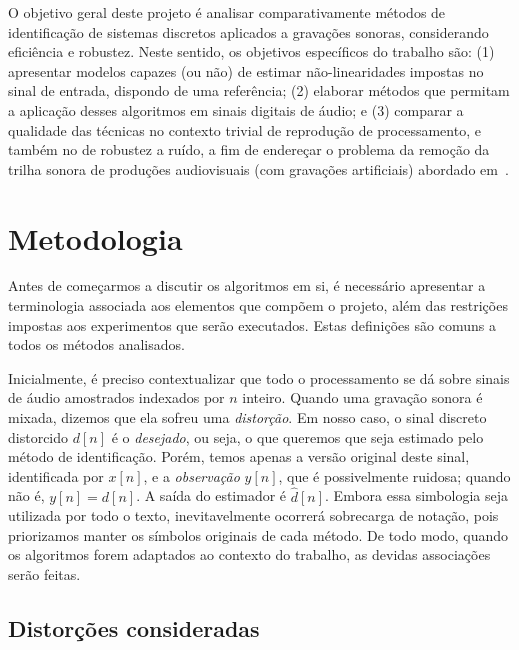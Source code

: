 O objetivo geral deste projeto é analisar comparativamente métodos de identificação de
sistemas discretos aplicados a gravações sonoras, considerando eficiência e robustez.
Neste sentido, os objetivos específicos do trabalho são: (1) apresentar modelos capazes
(ou não) de estimar não-linearidades impostas no sinal de entrada, dispondo de uma
referência; (2) elaborar métodos que permitam a aplicação desses algoritmos em sinais
digitais de áudio; e (3) comparar a qualidade das técnicas no contexto trivial de
reprodução de processamento, e também no de robustez a ruído, a fim de endereçar o
problema da remoção da trilha sonora de produções audiovisuais (com gravações
artificiais) abordado em~\cite{lordelo-2018}.

\section{Metodologia}

Antes de começarmos a discutir os algoritmos em si, é necessário apresentar a
terminologia associada aos elementos que compõem o projeto, além das restrições
impostas aos experimentos que serão executados. Estas definições são comuns a todos os
métodos analisados.

Inicialmente, é preciso contextualizar que todo o processamento se dá sobre sinais de
áudio amostrados indexados por $n$ inteiro. Quando uma gravação sonora é mixada,
dizemos que ela sofreu uma \emph{distorção}. Em nosso caso, o sinal discreto distorcido
$d[n]$ é o
\emph{desejado}, ou seja, o que queremos que seja estimado pelo método de
identificação. Porém, temos apenas a versão original deste sinal, identificada por
$x[n]$, e a \emph{observação}
$y[n]$, que é possivelmente ruidosa; quando não é, $y[n] = d[n]$. A saída do
estimador é $\hat{d}[n]$. Embora essa simbologia seja utilizada por todo o texto, inevitavelmente
ocorrerá sobrecarga de notação, pois priorizamos manter os símbolos originais de cada
método. De todo modo, quando os algoritmos forem adaptados ao contexto do trabalho, as
devidas associações serão feitas.

\subsection{Distorções consideradas}
\label{section:intro:distortions}

